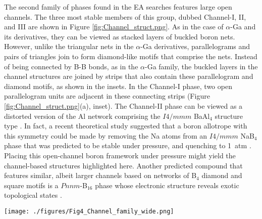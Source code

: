 \documentclass[reprint,aps,prl,twocolumn,letterpaper]{revtex4-2}
\newlength{\pagewidth}
\begin{document}
The second family of phases found in the EA searches features large open channels. The three most stable members of this group, dubbed Channel-I, II, and III are shown in Figure \ref{fig:Channel_struct.png}. As in the case of $\alpha$-Ga and its derivatives, they can be viewed as stacked layers of buckled boron nets. However, unlike the triangular nets in the $\alpha$-Ga derivatives, parallelograms and pairs of triangles join to form diamond-like motifs that comprise the nets. Instead of being connected by B-B bonds, as in the $\alpha$-Ga family, the buckled layers in the channel structures are joined by strips that also contain these parallelogram and diamond motifs, as shown in the insets. In the Channel-I phase, two open parallelogram units are adjacent in these connecting strips (Figure \ref{fig:Channel_struct.png}(a), inset). The Channel-II phase can be viewed as a distorted version of the Al network comprising the $I4/mmm$ BaAl$_4$ structure type \cite{Shatruk:2019a}.  In fact, a recent theoretical study suggested that a boron allotrope with this symmetry could be made by removing the Na atoms from an $I4/mmm$ NaB$_4$ phase that was predicted to be stable under pressure, and quenching to 1~atm \cite{Zhang:2020}. Placing this open-channel boron framework under pressure might yield the channel-based structures highlighted here. Another predicted compound that features similar, albeit larger channels based on networks of B$_4$ diamond and square motifs is a $Pnnm$-B$_{16}$ phase whose electronic structure reveals exotic topological states \cite{Dong:2018}. 

\begin{figure*}
\begin{center}
\texttt{[image: ./figures/Fig4\_Channel\_family\_wide.png]}
\end{center}
\caption{Channel-based family of boron structures that contain diamond-like B$_{4}$ motifs made from two edge-sharing triangles, along with more open parallelograms (strips connecting buckled layers are shown in the insets), with different arrangements producing different phases: (a) Channel-I, (b) Channel-II, and (c) Channel-III. The buckled layers comprising these phases are made from: two adjacent rows of diamond-like motifs separated by a single row of parallelogram units in (d) Channel-I, or alternating strips of diamond-like B$_4$ units and parallelograms as in the (e) Channel-II, and (f) Channel-III structures. 
\label{fig:Channel_struct.png}}
\end{figure*}
\end{document}
